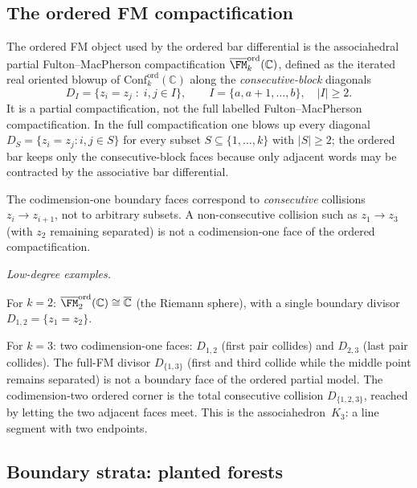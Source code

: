 \subsection{The ordered FM compactification}
\label{subsec:ordered-fm-compact}

\begin{construction}
\label{constr:ordered-fm-compact}
The ordered FM object used by the ordered bar differential is the
associahedral partial Fulton--MacPherson compactification
$\overline{\FM}_k^{\mathrm{ord}}(\mathbb C)$, defined as the
iterated real oriented blowup of
$\mathrm{Conf}_k^{\mathrm{ord}}(\mathbb C)$ along the
\emph{consecutive-block} diagonals
\[
D_I=\{z_i=z_j\;:\; i,j\in I\},\qquad
I=\{a,a+1,\dots,b\},\quad |I|\ge2.
\]
It is a partial compactification, not the full labelled
Fulton--MacPherson compactification. In the full compactification one
blows up every diagonal $D_S=\{z_i=z_j:i,j\in S\}$ for every subset
$S\subseteq\{1,\dots,k\}$ with $|S|\ge2$; the ordered bar keeps only
the consecutive-block faces because only adjacent words may be
contracted by the associative bar differential.

The codimension-one boundary faces correspond to
\emph{consecutive} collisions $z_i\to z_{i+1}$, not to
arbitrary subsets. A non-consecutive collision such as
$z_1\to z_3$ (with $z_2$ remaining separated) is not a
codimension-one face of the ordered compactification.

\medskip
\noindent\emph{Low-degree examples.}

For $k=2$:
$\overline{\FM}_2^{\mathrm{ord}}(\mathbb C)
\cong\overline{\mathbb C}$ (the Riemann sphere), with a
single boundary divisor $D_{1,2}=\{z_1=z_2\}$.

For $k=3$: two codimension-one faces: $D_{1,2}$ (first pair
collides) and $D_{2,3}$ (last pair collides). The full-FM divisor
$D_{\{1,3\}}$ (first and third collide while the middle point remains
separated) is not a boundary face of the ordered partial model. The
codimension-two ordered corner is the total consecutive collision
$D_{\{1,2,3\}}$, reached by letting the two adjacent faces meet. This
is the associahedron~$K_3$: a line segment with two endpoints.
\end{construction}

\subsection{Boundary strata: planted forests}
\label{subsec:boundary-strata-planted}


